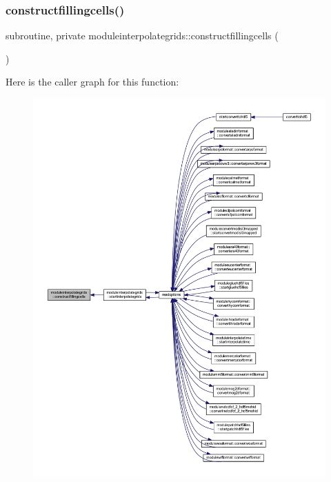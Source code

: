 \subsubsection{\texorpdfstring{constructfillingcells()}{constructfillingcells()}}
{\footnotesize\ttfamily subroutine, private moduleinterpolategrids\+::constructfillingcells (\begin{DoxyParamCaption}{ }\end{DoxyParamCaption})\hspace{0.3cm}{\ttfamily [private]}}

Here is the caller graph for this function\+:\nopagebreak
\begin{figure}[H]
\begin{center}
\leavevmode
\includegraphics[width=350pt]{namespacemoduleinterpolategrids_a3df578fd05d6020ac889661230172322_icgraph}
\end{center}
\end{figure}
\mbox{\label{namespacemoduleinterpolategrids_a569cf42cfeb7e7bc12b2bab66c56a0b1}} 
